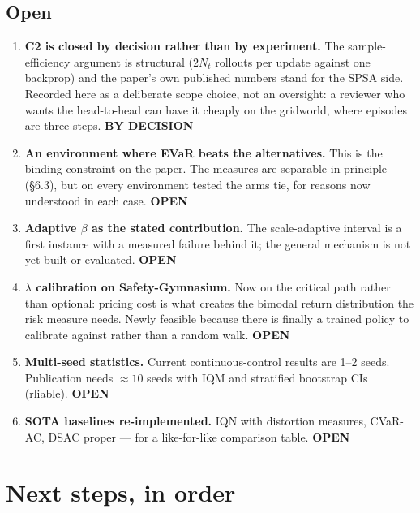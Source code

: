 \documentclass[11pt,a4paper]{article}
\newcommand{\opn}{\textcolor{open}{\textbf{OPEN}}}
\begin{document}
\subsection{Open}
\begin{enumerate}[leftmargin=1.5em,itemsep=0.2em]
\item \textbf{C2 is closed by decision rather than by experiment.} The
      sample-efficiency argument is structural ($2N_t$ rollouts per update against
      one backprop) and the paper's own published numbers stand for the SPSA side.
      Recorded here as a deliberate scope choice, not an oversight: a reviewer who
      wants the head-to-head can have it cheaply on the gridworld, where episodes
      are three steps. \textcolor{soft}{\textbf{BY DECISION}}
\item \textbf{An environment where EVaR beats the alternatives.} This is the
      binding constraint on the paper. The measures are separable in principle
      (\S6.3), but on every environment tested the arms tie, for reasons now
      understood in each case. \opn
\item \textbf{Adaptive $\beta$ as the stated contribution.} The scale-adaptive
      interval is a first instance with a measured failure behind it; the general
      mechanism is not yet built or evaluated. \opn
\item \textbf{$\lambda$ calibration on Safety-Gymnasium.} Now on the critical path
      rather than optional: pricing cost is what creates the bimodal return
      distribution the risk measure needs. Newly feasible because there is finally
      a trained policy to calibrate against rather than a random walk. \opn
\item \textbf{Multi-seed statistics.} Current continuous-control results are 1--2
      seeds. Publication needs $\approx 10$ seeds with IQM and stratified bootstrap
      CIs (rliable). \opn
\item \textbf{SOTA baselines re-implemented.} IQN with distortion measures, CVaR-AC,
      DSAC proper --- for a like-for-like comparison table. \opn
\end{enumerate}

\section{Next steps, in order}
\end{document}
